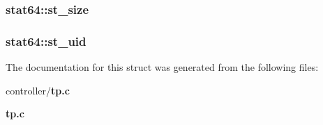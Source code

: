 \subsubsection[{st\_\-size}]{ {\bf stat64::st\_\-size}}\label{structstat64_a83c5c39975795d75f49c6747d12a049f}
\subsubsection[{st\_\-uid}]{ {\bf stat64::st\_\-uid}}\label{structstat64_a093d5b16c4c81f8e1610317d9a107593}


The documentation for this struct was generated from the following files:\begin{DoxyCompactItemize}
\item 
controller/{\bf tp.c}\item 
{\bf tp.c}\end{DoxyCompactItemize}
